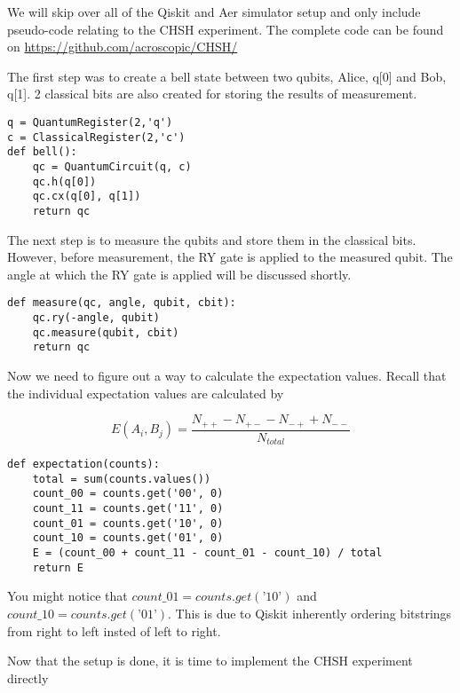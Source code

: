 \documentclass[12pt]{article}
\begin{document}
We will skip over all of the Qiskit and Aer simulator setup and only include  pseudo-code relating to the CHSH experiment. The complete code can be found on \url{https://github.com/acroscopic/CHSH/}

The first step was to create a bell state between two qubits, Alice, q[0] and Bob, q[1]. 2 classical bits are also created for storing the results of measurement.

\begin{lstlisting}[style=python]
q = QuantumRegister(2,'q')
c = ClassicalRegister(2,'c')
def bell():
    qc = QuantumCircuit(q, c)  
    qc.h(q[0])
    qc.cx(q[0], q[1])
    return qc    
\end{lstlisting}

The next step is to measure the qubits and store them in the classical bits. However, before measurement, the RY gate is applied to the measured qubit. The angle at which the RY gate is applied will be discussed shortly.

\begin{lstlisting}[style=python]
def measure(qc, angle, qubit, cbit):
    qc.ry(-angle, qubit)
    qc.measure(qubit, cbit)
    return qc
\end{lstlisting}

Now we need to figure out a way to calculate the expectation values. Recall that the individual expectation values are calculated by 

$$
E(A_i, B_j) = \frac{N_{++} - N_{+-} - N_{-+} + N_{--}}{N_{total}}
$$

\begin{lstlisting}[style=python]
def expectation(counts):
    total = sum(counts.values())
    count_00 = counts.get('00', 0)
    count_11 = counts.get('11', 0)
    count_01 = counts.get('10', 0)
    count_10 = counts.get('01', 0)
    E = (count_00 + count_11 - count_01 - count_10) / total
    return E
\end{lstlisting}

You might notice that $count\_01 = counts.get(’10’)$ and $count\_10 = counts.get(’01’)$. This is due to Qiskit inherently ordering bitstrings from right to left insted of left to right.

\newpage
Now that the setup is done, it is time to implement the CHSH experiment directly
\end{document}
